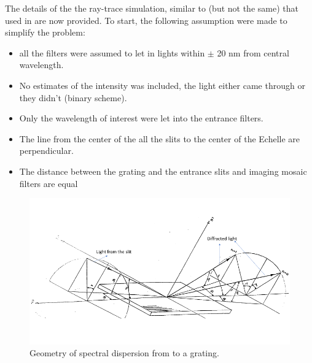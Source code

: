 \documentclass[crop=false,class=mitthesis,oneside,font=12pt]{standalone}
\begin{document}
The details of the the ray-trace simulation, similar to (but not the same) that used in \cite{hitmis} are now provided. To start, the following assumption were made to simplify the problem:
\begin{itemize}
\item all the filters were assumed to let in lights within $\pm$ 20 nm from central wavelength.
\item No estimates of the intensity was included, the light either came through or they didn't (binary scheme).
\item Only the wavelength of interest were let into the entrance filters.
\item The line from the center of the all the slits to the center of the Echelle are perpendicular.
\item The distance between the grating and the entrance slits and imaging mosaic filters are equal
\end{itemize}
\begin{figure}[H]
	\centering\includegraphics[width=35pc]{grating_stp.png}
	\caption{Geometry of spectral dispersion from to a grating. }
	\label{fig:grating}
\end{figure}
\end{document}
